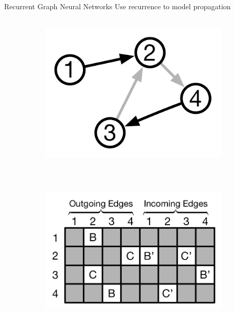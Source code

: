 \documentclass[final,hyperref={pdfpagelabels=false}]{beamer}
\newcommand{\shrink}{-15pt}
\begin{document}
\begin{frame}[t]
\begin{columns}[t]
\begin{column}{.3\textwidth}
    
    
    \vspace{\shrink} 
    \begin{block}{Recurrent Graph Neural Networks}
    Use recurrence to model propagation
    
      \begin{figure}
        \centering
        \begin{subfigure}{.25\textwidth}
          \centering
          \includegraphics[height=3in]{imgs/example-graph.pdf}
          \caption{}
          \label{fig:sub1}
        \end{subfigure}%
        \hfill
        \begin{subfigure}{.43\textwidth}
          \centering
          \includegraphics[height=3in]{imgs/recurrent-matrix-sparsity-pattern2.pdf}
          \caption{}
          \label{fig:sub2}
        \end{subfigure}
        \begin{subfigure}{.25\textwidth}
          \centering

\end{subfigure}
\end{figure}
\end{block}
\end{column}
\end{columns}
\end{frame}
\end{document}
